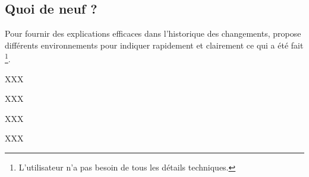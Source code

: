 \documentclass[10pt, a4paper]{article}
\begin{document}

\subsection{Quoi de neuf ?}

Pour fournir des explications efficaces dans l'historique des changements,  propose différents environnements pour indiquer rapidement et clairement ce qui a été fait
\footnote{
	L'utilisateur n'a pas besoin de tous les détails techniques.
}.


\begin{bdocexa}[Nouveautés]
    XXX

\end{bdocexa}


\begin{bdocexa}
    XXX

\end{bdocexa}


\begin{bdocexa}[Réparations]
    XXX

\end{bdocexa}


\begin{bdocexa}
    XXX

\end{bdocexa}
\end{document}
